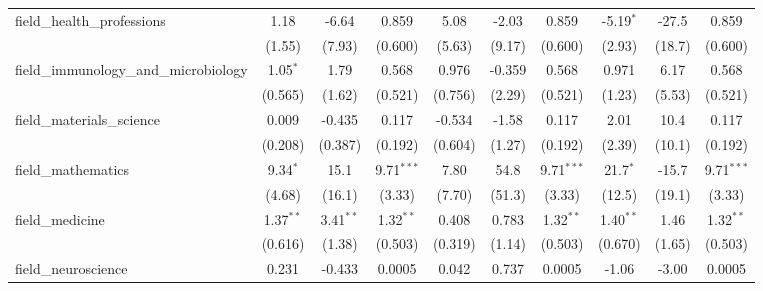 \begin{tabular}{lccccccccc}
   field\_health\_professions                                  & 1.18          & -6.64         & 0.859          & 5.08          & -2.03        & 0.859          & -5.19$^{*}$  & -27.5        & 0.859\\   
                                                               & (1.55)        & (7.93)        & (0.600)        & (5.63)        & (9.17)       & (0.600)        & (2.93)       & (18.7)       & (0.600)\\   
   field\_immunology\_and\_microbiology                        & 1.05$^{*}$    & 1.79          & 0.568          & 0.976         & -0.359       & 0.568          & 0.971        & 6.17         & 0.568\\   
                                                               & (0.565)       & (1.62)        & (0.521)        & (0.756)       & (2.29)       & (0.521)        & (1.23)       & (5.53)       & (0.521)\\   
   field\_materials\_science                                   & 0.009         & -0.435        & 0.117          & -0.534        & -1.58        & 0.117          & 2.01         & 10.4         & 0.117\\   
                                                               & (0.208)       & (0.387)       & (0.192)        & (0.604)       & (1.27)       & (0.192)        & (2.39)       & (10.1)       & (0.192)\\   
   field\_mathematics                                          & 9.34$^{*}$    & 15.1          & 9.71$^{***}$   & 7.80          & 54.8         & 9.71$^{***}$   & 21.7$^{*}$   & -15.7        & 9.71$^{***}$\\   
                                                               & (4.68)        & (16.1)        & (3.33)         & (7.70)        & (51.3)       & (3.33)         & (12.5)       & (19.1)       & (3.33)\\   
   field\_medicine                                             & 1.37$^{**}$   & 3.41$^{**}$   & 1.32$^{**}$    & 0.408         & 0.783        & 1.32$^{**}$    & 1.40$^{**}$  & 1.46         & 1.32$^{**}$\\   
                                                               & (0.616)       & (1.38)        & (0.503)        & (0.319)       & (1.14)       & (0.503)        & (0.670)      & (1.65)       & (0.503)\\   
   field\_neuroscience                                         & 0.231         & -0.433        & 0.0005         & 0.042         & 0.737        & 0.0005         & -1.06        & -3.00        & 0.0005\\   

\end{tabular}

